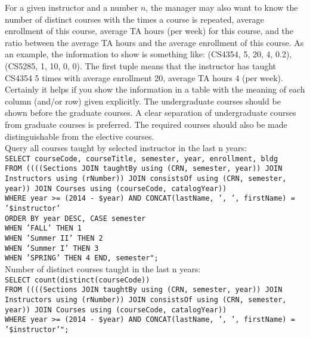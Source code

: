 \begin{enumerate}
\begin{enumerate}
			For a given instructor and a number $n$, the manager may also want to know the number of distinct courses with the times a course is repeated, average enrollment of this course, average TA hours (per week) for this course, and the ratio between the average TA hours and the average enrollment of this course. As an example, the information to show is something like: (CS4354, 5, 20, 4, 0.2), (CS5285, 1, 10, 0, 0). The first tuple means that the instructor has taught CS4354 5 times with average enrollment 20, average TA hours 4 (per week). Certainly it helps if you show the information in a table with the meaning of each column (and/or row) given explicitly. The undergraduate courses should be shown before the graduate courses. A clear separation of undergraduate courses from graduate courses is preferred. The required courses should also be made distinguishable from the elective courses.\\

			Query all courses taught by selected instructor in the last n years:\\
        	\texttt{SELECT courseCode, courseTitle, semester, year, enrollment, bldg\\
					FROM ((((Sections JOIN taughtBy using (CRN, semester, year)) JOIN Instructors using (rNumber)) JOIN consistsOf using (CRN, semester, year)) JOIN Courses using (courseCode, catalogYear))\\
					WHERE year >= (2014 - \$year) AND CONCAT(lastName, ', ', firstName) = '\$instructor'\\
					ORDER BY year DESC, CASE semester\\
					WHEN 'FALL' THEN 1\\
					WHEN 'Summer II' THEN 2\\
					WHEN 'Summer I' THEN 3\\
					WHEN 'SPRING' THEN 4 END, semester";}\\
					
			Number of distinct courses taught in the last n years:\\
        	\texttt{SELECT count(distinct(courseCode))\\
					FROM ((((Sections JOIN taughtBy using (CRN, semester, year)) JOIN Instructors using (rNumber)) JOIN consistsOf using (CRN, semester, year)) JOIN Courses using (courseCode, catalogYear))\\
					WHERE year >= (2014 - \$year) AND CONCAT(lastName, ', ', firstName) = '\$instructor'";}\\
					

\end{enumerate}
\end{enumerate}
